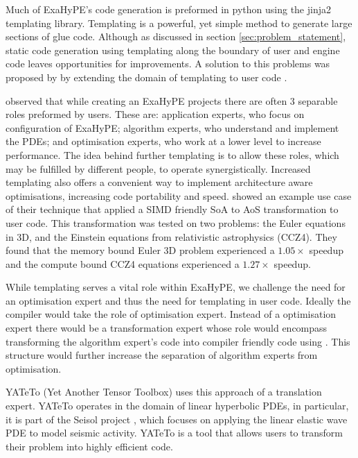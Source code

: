 

Much of ExaHyPE's code generation is preformed in python using the jinja2 templating library.
Templating is a powerful, yet simple method to generate large sections of glue code.
Although as discussed in section \ref{sec:problem_statement}, static code generation using templating along the boundary of user and engine code leaves opportunities for improvements.  
A solution to this problems was proposed by \citeauthor{templateExahype} by extending the domain of templating to user code \cite{templateExahype}.

\citeauthor{templateExahype} observed that while creating an ExaHyPE projects there are often 3 separable roles preformed by users.
These are: application experts, who focus on configuration of ExaHyPE; algorithm experts, who understand and implement the PDEs; and optimisation experts, who work at a lower level to increase performance.
The idea behind further templating is to allow these roles, which may be fulfilled by different people, to operate synergistically.
Increased templating also offers a convenient way to implement architecture aware optimisations, increasing code portability and speed.
\citeauthor{templateExahype} showed an example use case of their technique that applied a SIMD friendly SoA to AoS transformation to user code.
This transformation was tested on two problems: the Euler equations in 3D, and the Einstein equations from relativistic astrophysics (CCZ4).
They found that the memory bound Euler 3D problem experienced a $1.05\times$ speedup and the compute bound CCZ4 equations experienced a $1.27\times$ speedup.

While templating serves a vital role within ExaHyPE, we challenge the need for an optimisation expert and thus the need for templating in user code.
Ideally the compiler would take the role of optimisation expert.
Instead of a optimisation expert there would be a transformation expert whose role would encompass transforming the algorithm expert's code into compiler friendly code using \phlat.
This structure would further increase the separation of algorithm experts from optimisation.


YATeTo (Yet Another Tensor Toolbox) \cite{YATeTo} uses this approach of a translation expert.
YATeTo operates in the domain of linear hyperbolic PDEs, in particular, it is part of the Seisol project \cite{seisolPFLOP}, which focuses on applying the linear elastic wave PDE to model seismic activity.
YATeTo is a tool that allows users to transform their problem into highly efficient code.   

